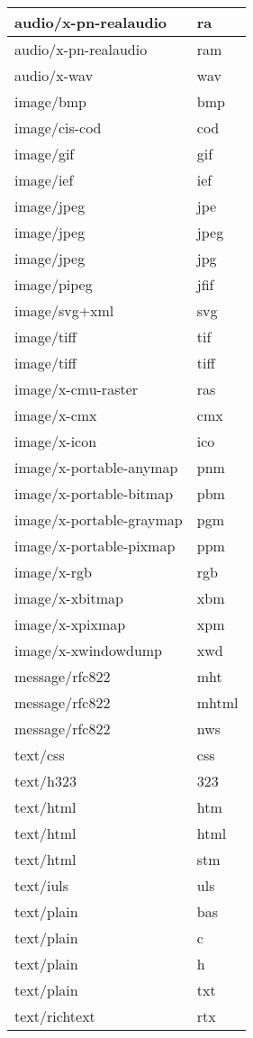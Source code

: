 \begin{longtable}{|p{200pt}|p{40pt}|}
audio/x-pn-realaudio	&ra\\
\hline
audio/x-pn-realaudio	&ram\\
\hline
audio/x-wav	&wav\\
\hline
image/bmp	&bmp\\
\hline
image/cis-cod	&cod\\
\hline
image/gif	&gif\\
\hline
image/ief	&ief\\
\hline
image/jpeg	&jpe\\
\hline
image/jpeg	&jpeg\\
\hline
image/jpeg	&jpg\\
\hline
image/pipeg	&jfif\\
\hline
image/svg+xml	&svg\\
\hline
image/tiff	&tif\\
\hline
image/tiff	&tiff\\
\hline
image/x-cmu-raster	&ras\\
\hline
image/x-cmx	&cmx\\
\hline
image/x-icon	&ico\\
\hline
image/x-portable-anymap	&pnm\\
\hline
image/x-portable-bitmap	&pbm\\
\hline
image/x-portable-graymap	&pgm\\
\hline
image/x-portable-pixmap	&ppm\\
\hline
image/x-rgb	&rgb\\
\hline
image/x-xbitmap	&xbm\\
\hline
image/x-xpixmap	&xpm\\
\hline
image/x-xwindowdump	&xwd\\
\hline
message/rfc822	&mht\\
\hline
message/rfc822	&mhtml\\
\hline
message/rfc822	&nws\\
\hline
text/css	&css\\
\hline
text/h323	&323\\
\hline
text/html	&htm\\
\hline
text/html	&html\\
\hline
text/html	&stm\\
\hline
text/iuls	&uls\\
\hline
text/plain	&bas\\
\hline
text/plain	&c\\
\hline
text/plain	&h\\
\hline
text/plain	&txt\\
\hline
text/richtext&	rtx\\

\end{longtable}
